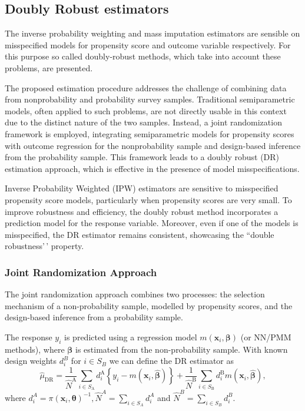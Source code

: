 \documentclass[
]{jss}
\begin{document}
\hypertarget{doubly-robust-estimators}{%
\subsection{Doubly Robust estimators}\label{doubly-robust-estimators}}

The inverse probability weighting and mass imputation estimators are
sensible on misspecified models for propensity score and outcome
variable respectively. For this purpose so called doubly-robust methods,
which take into account these problems, are presented.

The proposed estimation procedure addresses the challenge of combining
data from nonprobability and probability survey samples. Traditional
semiparametric models, often applied to such problems, are not directly
usable in this context due to the distinct nature of the two samples.
Instead, a joint randomization framework is employed, integrating
semiparametric models for propensity scores with outcome regression for
the nonprobability sample and design-based inference from the
probability sample. This framework leads to a doubly robust (DR)
estimation approach, which is effective in the presence of model
misspecifications.

Inverse Probability Weighted (IPW) estimators are sensitive to
misspecified propensity score models, particularly when propensity
scores are very small. To improve robustness and efficiency, the doubly
robust method incorporates a prediction model for the response variable.
Moreover, even if one of the models is misspecified, the DR estimator
remains consistent, showcasing the ``double robustness'\,' property.

\hypertarget{joint-randomization-approach}{%
\subsubsection{Joint Randomization
Approach}\label{joint-randomization-approach}}

The joint randomization approach combines two processes: the selection
mechanism of a non-probability sample, modelled by propensity scores,
and the design-based inference from a probability sample.

The response \(y_i\) is predicted using a regression model
\(m(\boldsymbol{x}_i, \boldsymbol{\beta})\) (or NN/PMM methods), where
\(\boldsymbol{\beta}\) is estimated from the non-probability sample.
With known design weights \(d_i^B\) for \(i \in S_B\) we can define the
DR estimator as \begin{equation}
\label{dr}
\hat{\mu}_{\mathrm{DR}}=\frac{1}{\hat{N}^{\mathrm{A}}} \sum_{i \in S_{\mathrm{A}}} d_i^{\mathrm{A}}\left\{y_i-m\left(\boldsymbol{x}_i, \hat{\boldsymbol{\beta}}\right)\right\}+\frac{1}{\hat{N}^{\mathrm{B}}} \sum_{i \in S_{\mathrm{B}}} d_i^{\mathrm{B}} m\left(\boldsymbol{x}_i, \hat{\boldsymbol{\beta}}\right),
\end{equation} where
\(d_i^A=\pi\left(\boldsymbol{x}_i, \boldsymbol{\theta}\right)^{-1}, \hat{N}^A=\sum_{i \in S_A} d_i^A\)
and \(\hat{N}^B=\sum_{i \in S_B} d_i^B\).
\end{document}
